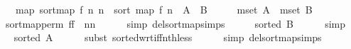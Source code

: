 \begin{isabellebody}
\ \ \ {\isachardoublequoteopen}map\ {\isacharparenleft}{\kern0pt}sort{\isacharunderscore}{\kern0pt}map\ f\ n{\isacharparenright}{\kern0pt}\ {\isacharbrackleft}{\kern0pt}{}{\isachardot}{\kern0pt}{\isachardot}{\kern0pt}{\isacharless}{\kern0pt}n{\isacharbrackright}{\kern0pt}\ {\isacharequal}{\kern0pt}\ sort\ {\isacharparenleft}{\kern0pt}map\ f\ {\isacharbrackleft}{\kern0pt}{}{\isachardot}{\kern0pt}{\isachardot}{\kern0pt}{\isacharless}{\kern0pt}n{\isacharbrackright}{\kern0pt}{\isacharparenright}{\kern0pt}{\isachardoublequoteclose}\ {\isacharparenleft}{\kern0pt}\ {\isachardoublequoteopen}{\isacharquery}{\kern0pt}A\ {\isacharequal}{\kern0pt}\ {\isacharquery}{\kern0pt}B{\isachardoublequoteclose}{\isacharparenright}{\kern0pt}\isanewline
%
\isadelimproof
%
\endisadelimproof
%
\isatagproof
{}\isamarkupfalse%
\ {\isacharminus}{\kern0pt}\isanewline
\ \ \isamarkupfalse%
\ {\isachardoublequoteopen}mset\ {\isacharquery}{\kern0pt}A\ {\isacharequal}{\kern0pt}\ mset\ {\isacharquery}{\kern0pt}B{\isachardoublequoteclose}\isanewline
\ \ \ \ \isamarkupfalse%
\ sort{\isacharunderscore}{\kern0pt}map{\isacharunderscore}{\kern0pt}perm{\isacharbrackleft}{\kern0pt}\ f{\isacharequal}{\kern0pt}{\isachardoublequoteopen}f{\isachardoublequoteclose}\ \ n{\isacharequal}{\kern0pt}{\isachardoublequoteopen}n{\isachardoublequoteclose}{\isacharbrackright}{\kern0pt}\isanewline
\ \ \ \ \isamarkupfalse%
\ {\isacharparenleft}{\kern0pt}simp\ del{\isacharcolon}{\kern0pt}sort{\isacharunderscore}{\kern0pt}map{\isachardot}{\kern0pt}simps{\isacharparenright}{\kern0pt}\isanewline
\ \ \isamarkupfalse%
\ \isamarkupfalse%
\ {\isachardoublequoteopen}sorted\ {\isacharquery}{\kern0pt}B{\isachardoublequoteclose}\isanewline
\ \ \ \ \isamarkupfalse%
\ simp\isanewline
\ \ \isamarkupfalse%
\ \isamarkupfalse%
\ {\isachardoublequoteopen}sorted\ {\isacharquery}{\kern0pt}A{\isachardoublequoteclose}\isanewline
\ \ \ \ \isamarkupfalse%
\ {\isacharparenleft}{\kern0pt}subst\ sorted{\isacharunderscore}{\kern0pt}wrt{\isacharunderscore}{\kern0pt}iff{\isacharunderscore}{\kern0pt}nth{\isacharunderscore}{\kern0pt}less{\isacharparenright}{\kern0pt}\isanewline
\ \ \ \ \isamarkupfalse%
\ {\isacharparenleft}{\kern0pt}simp\ del{\isacharcolon}{\kern0pt}sort{\isacharunderscore}{\kern0pt}map{\isachardot}{\kern0pt}simps{\isacharparenright}{\kern0pt}\isanewline

\end{isabellebody}
